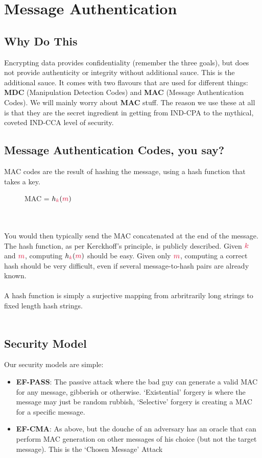 \section{Message Authentication}
    \subsection{Why Do This}
        Encrypting data provides confidentiality (remember the three goals), but does not provide authenticity or integrity without additional sauce. This is the additional sauce.
        It comes with two flavours that are used for different things: \textbf{MDC} (Manipulation Detection Codes) and \textbf{MAC} (Message Authentication Codes). We will mainly worry about \textbf{MAC} stuff.
        The reason we use these at all is that they are the secret ingredient in getting from IND-CPA to the mythical, coveted IND-CCA level of security.


    \subsection{\textbf{M}essage \textbf{A}uthentication \textbf{C}odes, you say?}
    MAC codes are the result of hashing the message, using a hash function that takes a key.
    \begin{figure}[htp!]
        \centering
        MAC = $h_{\ck}(\cm)$
    \end{figure}\\
    \\
    You would then typically send the MAC concatenated at the end of the message. The hash function, as per Kerckhoff's principle, is publicly described. Given $\ck$ and $\cm$, computing $h_{\ck}(\cm)$ should be easy.
    Given only $\cm$, computing a correct hash should be very difficult, even if several message-to-hash pairs are already known.\\
    \\
    A hash function is simply a surjective mapping from arbritrarily long strings to fixed length hash strings. \\
    \\
    \subsection{Security Model}
    Our security models are simple:
    \begin{itemize}
        \item \textbf{EF-PASS}: The passive attack where the bad guy can generate a valid MAC for any message, gibberish or otherwise. 
        `Existential' forgery is where the message may just be random rubbish, `Selective' forgery is creating a MAC for a specific message.

        \item \textbf{EF-CMA}: As above, but the douche of an adversary has an oracle that can perform MAC generation on other messages of his choice (but not the target message). This is the `Chosen Message' Attack
    \end{itemize}

